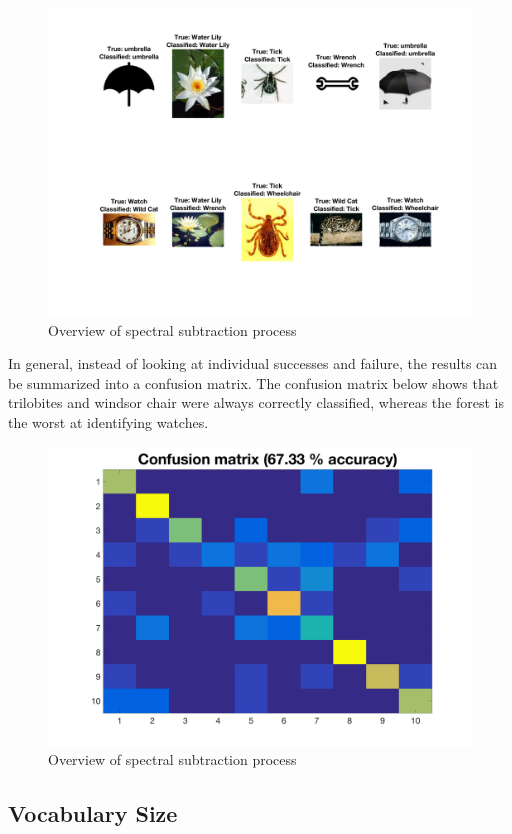 \documentclass[a4paper,pra,twocolumn,10pt,aps,longbibliography,nobalancelastpage]{revtex4-1}
\begin{document}
\begin{figure}[H]
	\centering
    \includegraphics[width=\columnwidth]{images}
    \caption{Overview of spectral subtraction process}
\end{figure}

In general, instead of looking at individual successes and failure, the results can be summarized into a confusion matrix. The confusion matrix below shows that trilobites and windsor chair were always correctly classified, whereas the forest is the worst at identifying watches. 

\begin{figure}[H]
	\centering
    \includegraphics[width=0.70\columnwidth]{confus}    
    \caption{Overview of spectral subtraction process}
\end{figure}


\subsection*{Vocabulary Size}
\end{document}
